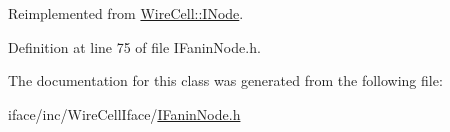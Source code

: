 Reimplemented from \hyperlink{class_wire_cell_1_1_i_node_aba7e537684cb4f2453796ff73da2d602}{Wire\+Cell\+::\+I\+Node}.



Definition at line 75 of file I\+Fanin\+Node.\+h.



The documentation for this class was generated from the following file\+:\begin{DoxyCompactItemize}
\item 
iface/inc/\+Wire\+Cell\+Iface/\hyperlink{_i_fanin_node_8h}{I\+Fanin\+Node.\+h}\end{DoxyCompactItemize}
